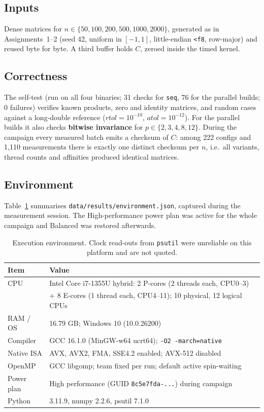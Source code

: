 \documentclass[11pt,a4paper]{article}
\begin{document}
\subsection{Inputs}

Dense matrices for $n \in \{50,100,200,500,1000,2000\}$, generated as in
Assignments~1--2 (seed 42, uniform in $[-1,1]$, little-endian \texttt{<f8},
row-major) and reused byte for byte. A third buffer holds $C$, zeroed
inside the timed kernel.

\subsection{Correctness}

The self-test (run on all four binaries; 31 checks for \texttt{seq}, 76 for
the parallel builds; 0 failures) verifies known products, zero and identity
matrices, and random cases against a long-double reference
($\textit{rtol}=10^{-10}$, $\textit{atol}=10^{-12}$). For the parallel
builds it also checks \textbf{bitwise invariance} for $p \in
\{2,3,4,8,12\}$. During the campaign every measured batch emits a checksum
of $C$: among 222 configs and 1{,}110 measurements there is exactly one
distinct checksum per $n$, i.e.\ all variants, thread counts and affinities
produced identical matrices.

\subsection{Environment}

Table~\ref{tab:env} summarises \texttt{data/results/environment.json},
captured during the measurement session. The High-performance power plan
was active for the whole campaign and Balanced was restored afterwards.

\begin{table}[h!]
\centering
\small
\begin{tabular}{ll}
\toprule
Item & Value \\
\midrule
CPU & Intel Core i7-1355U hybrid: 2 P-cores (2 threads each, CPU0--3) \\
     & + 8 E-cores (1 thread each, CPU4--11); 10 physical, 12 logical CPUs \\
RAM / OS & 16.79 GB; Windows 10 (10.0.26200) \\
Compiler & GCC 16.1.0 (MinGW-w64 ucrt64); \texttt{-O2 -march=native} \\
Native ISA & AVX, AVX2, FMA, SSE4.2 enabled; AVX-512 disabled \\
OpenMP & GCC libgomp; team fixed per run; default active spin-waiting \\
Power plan & High performance (GUID \texttt{8c5e7fda-...}) during campaign \\
Python & 3.11.9, numpy 2.2.6, psutil 7.1.0 \\
\bottomrule
\end{tabular}
\caption{Execution environment. Clock read-outs from \texttt{psutil} were
unreliable on this platform and are not quoted.}
\label{tab:env}
\end{table}
\end{document}
